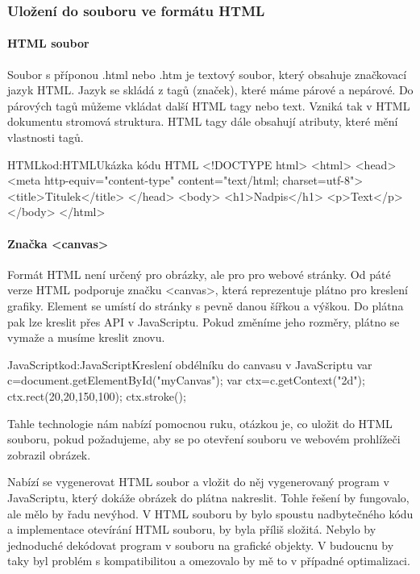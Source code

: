 \documentclass[
  field=inf,
  biblatex,
  glossaries,
  index
]{kidiplom}
\begin{document}
\subsubsection{Uložení do souboru ve formátu HTML}

\paragraph{HTML soubor}

Soubor s příponou .html nebo .htm je textový soubor, který obsahuje značkovací jazyk HTML. Jazyk se skládá z tagů (značek), které máme párové a nepárové. Do párových tagů můžeme vkládat další HTML tagy nebo text. Vzniká tak v HTML dokumentu stromová struktura. HTML tagy dále obsahují atributy, které mění vlastnosti tagů.

\begin{kicode}{HTML}{kod:HTML}{Ukázka kódu HTML}
<!DOCTYPE html>
<html>
  <head>
  <meta http-equiv="content-type" content="text/html; charset=utf-8">
  <title>Titulek</title>
  </head>
  <body>
    <h1>Nadpis</h1>
    <p>Text</p>
  </body>
</html>
\end{kicode}

\paragraph{Značka <canvas>}

Formát HTML není určený pro obrázky, ale pro pro webové stránky. Od páté verze HTML podporuje značku <canvas>, která reprezentuje plátno pro kreslení grafiky. Element se umístí do stránky s pevně danou šířkou a výškou. Do plátna pak lze kreslit přes API v JavaScriptu. Pokud změníme jeho rozměry, plátno se vymaže a musíme kreslit znovu.

\begin{kicode}{JavaScript}{kod:JavaScript}{Kreslení obdélníku do canvasu v JavaScriptu}
var c=document.getElementById("myCanvas");
var ctx=c.getContext("2d");
ctx.rect(20,20,150,100);
ctx.stroke();
\end{kicode}

Tahle technologie nám nabízí pomocnou ruku, otázkou je, co uložit do HTML souboru, pokud požadujeme, aby se po otevření souboru ve webovém prohlížeči zobrazil obrázek.

Nabízí se vygenerovat HTML soubor a vložit do něj vygenerovaný program v JavaScriptu, který dokáže obrázek do plátna nakreslit. Tohle řešení by fungovalo, ale mělo by řadu nevýhod. V HTML souboru by bylo spoustu nadbytečného kódu a implementace otevírání HTML souboru, by byla příliš složitá. Nebylo by jednoduché dekódovat program v souboru na grafické objekty. V budoucnu by taky byl problém s kompatibilitou a omezovalo by mě to v případné optimalizaci.
\end{document}
